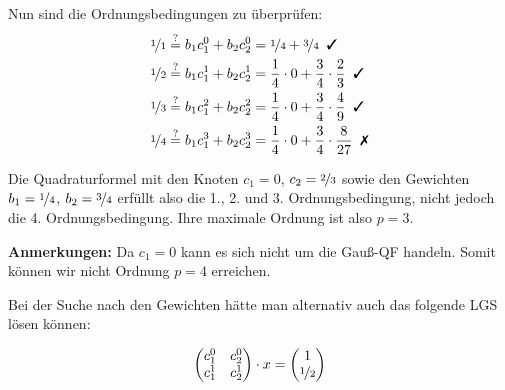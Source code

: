 Nun sind die Ordnungsbedingungen zu überprüfen:
\begin{align}
    \nicefrac{1}{1} &\stackrel{?}{=} b_1 c_1^0 + b_2 c_2^0 = \nicefrac{1}{4} + \nicefrac{3}{4} \text{\;\;\cmark}\\
    \nicefrac{1}{2} &\stackrel{?}{=} b_1 c_1^1 + b_2 c_2^1 = \frac{1}{4} \cdot 0 + \frac{3}{4} \cdot \frac{2}{3} \text{\;\;\cmark}\\
    \nicefrac{1}{3} &\stackrel{?}{=} b_1 c_1^2 + b_2 c_2^2 = \frac{1}{4} \cdot 0 + \frac{3}{4} \cdot \frac{4}{9} \text{\;\;\cmark}\\
    \nicefrac{1}{4} &\stackrel{?}{=} b_1 c_1^3 + b_2 c_2^3 = \frac{1}{4} \cdot 0 + \frac{3}{4} \cdot \frac{8}{27} \text{\;\;\xmark}\\
\end{align}

Die Quadraturformel mit den Knoten $c_1 = 0$, $c_2 = \nicefrac{2}{3}$ sowie
den Gewichten $b_1 = \nicefrac{1}{4}$, $b_2 = \nicefrac{3}{4}$ erfüllt
also die 1., 2. und 3. Ordnungsbedingung, nicht jedoch die 4.
Ordnungsbedingung. Ihre maximale Ordnung ist also $p=3$.

\textbf{Anmerkungen:} Da $c_1 = 0$ kann es sich nicht um die Gauß-QF handeln.
Somit können wir nicht Ordnung $p=4$ erreichen.

Bei der Suche nach den Gewichten hätte man alternativ auch das folgende
LGS lösen können:

\begin{align}
    \begin{pmatrix}
        c_1^0 & c_2^0\\
        c_1^1 & c_2^1 
    \end{pmatrix}
    \cdot x
    =
    \begin{pmatrix}
        1\\
        \nicefrac{1}{2}
    \end{pmatrix}
\end{align}
